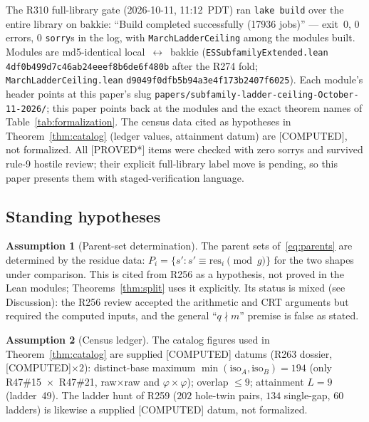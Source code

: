 \documentclass[11pt,a4paper]{article}
\theoremstyle{definition}
\newtheorem{assumption}{Assumption}
\begin{document}
The R310 full-library gate (2026-10-11, 11:12~PDT) ran
\texttt{lake build} over the entire library on bakkie:
``Build completed successfully (17936 jobs)'' --- exit~$0$, $0$ errors,
$0$ \texttt{sorry}s in the log, with \texttt{MarchLadderCeiling} among
the modules built. Modules are md5-identical local~$\leftrightarrow$~bakkie
(\texttt{ESSubfamilyExtended.lean} \texttt{4df0b499d7c46ab24eeef8b6de6f480b}
after the R274 fold; \texttt{MarchLadderCeiling.lean}
\texttt{d9049f0dfb5b94a3e4f173b2407f6025}). Each module's header points
at this paper's slug
\texttt{papers/subfamily-ladder-ceiling-October-11-2026/}; this paper
points back at the modules and the exact theorem names of
Table~\ref{tab:formalization}. The census data cited as hypotheses in
Theorem~\ref{thm:catalog} (ledger values, attainment datum) are
[COMPUTED], not formalized. All [PROVED*] items were checked with zero
sorrys and survived rule-9 hostile review; their explicit full-library
label move is pending, so this paper presents them with
staged-verification language.

\subsection{Standing hypotheses}

\begin{assumption}[Parent-set determination]
  \label{asm:determ}
  The parent sets of~\eqref{eq:parents} are determined by the residue
  data: $P_i=\{s':s'\equiv\mathrm{res}_i\pmod{g}\}$ for the two shapes
  under comparison. This is cited from R256 as a hypothesis, not proved
  in the Lean modules; Theorems~\ref{thm:split} uses it explicitly.
  Its status is mixed (see Discussion): the R256 review accepted the
  arithmetic and CRT arguments but required the computed inputs, and the
  general ``$q\nmid m$'' premise is false as stated.
\end{assumption}

\begin{assumption}[Census ledger]
  \label{asm:ledger}
  The catalog figures used in Theorem~\ref{thm:catalog} are supplied
  [COMPUTED] datums (R263 dossier, [COMPUTED]$\times2$): distinct-base
  maximum $\min(\mathrm{iso}_A,\mathrm{iso}_B)=194$ (only
  R47\#15~$\times$~R47\#21, raw$\times$raw and $\varphi\times\varphi$);
  overlap $\le9$; attainment $L=9$ (ladder~49). The ladder hunt of R259
  ($202$ hole-twin pairs, $134$ single-gap, $60$ ladders) is likewise a
  supplied [COMPUTED] datum, not formalized.
\end{assumption}
\end{document}
